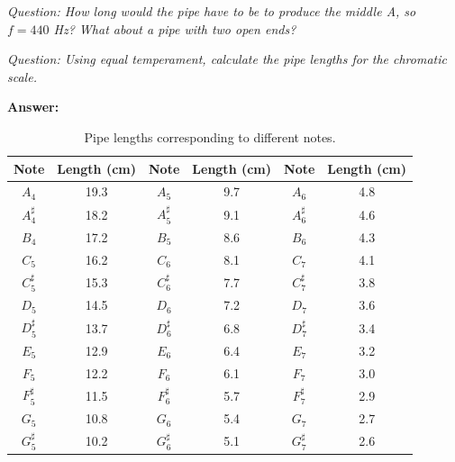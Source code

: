 \documentclass[a4paper, 11pt]{article}
\begin{document}
\textit{Question: How long would the pipe have to be to produce the middle A, so $f = 440$ Hz? What about a pipe with two open ends?}

\vspace{3cm}

\textit{Question: Using equal temperament, calculate the pipe lengths for the chromatic scale.}

\vspace{5cm}

\newpage 

\textbf{Answer:}

\begin{table}[ht]
    \centering
    \begin{tabular}{cc|cc|cc}
        \textbf{Note} & \textbf{Length (cm)} &
        \textbf{Note} & \textbf{Length (cm)} &
        \textbf{Note} & \textbf{Length (cm)} \\ \hline
        $A_4$        & 19.3 & $A_5$        & 9.7 & $A_6$        & 4.8 \\
        $A^\sharp_4$ & 18.2 & $A^\sharp_5$ & 9.1 & $A^\sharp_6$ & 4.6 \\
        $B_4$        & 17.2 & $B_5$        & 8.6 & $B_6$        & 4.3 \\
        $C_5$        & 16.2 & $C_6$        & 8.1 & $C_7$        & 4.1 \\
        $C^\sharp_5$ & 15.3 & $C^\sharp_6$ & 7.7 & $C^\sharp_7$ & 3.8 \\
        $D_5$        & 14.5 & $D_6$        & 7.2 & $D_7$        & 3.6 \\
        $D^\sharp_5$ & 13.7 & $D^\sharp_6$ & 6.8 & $D^\sharp_7$ & 3.4 \\
        $E_5$        & 12.9 & $E_6$        & 6.4 & $E_7$        & 3.2 \\
        $F_5$        & 12.2 & $F_6$        & 6.1 & $F_7$        & 3.0 \\
        $F^\sharp_5$ & 11.5 & $F^\sharp_6$ & 5.7 & $F^\sharp_7$ & 2.9 \\
        $G_5$        & 10.8 & $G_6$        & 5.4 & $G_7$        & 2.7 \\
        $G^\sharp_5$ & 10.2 & $G^\sharp_6$ & 5.1 & $G^\sharp_7$ & 2.6 \\
    \end{tabular}
    \caption{Pipe lengths corresponding to different notes.}
    \label{tab:pipe_lengths}
\end{table}
\end{document}
